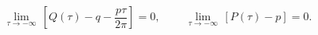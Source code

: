 \begin{equation}\label{in-varibales}
\lim_{\tau \rightarrow -\infty}\,
\left[Q(\tau) - q-\frac{p\tau}{2\pi}\right]=0,
~~~~~~~~~~\lim_{\tau \rightarrow -\infty}\,\left[ P(\tau)-p\right] =0.
\end{equation}

